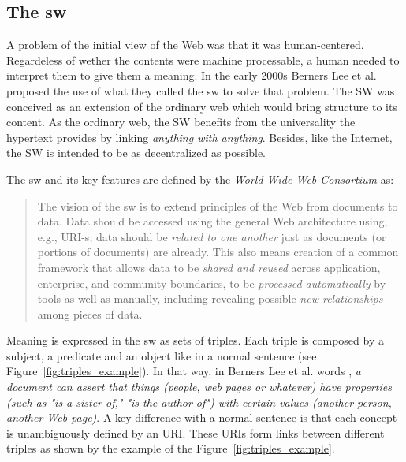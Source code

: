 \subsection{The \acl{sw}}

A problem of the initial view of the Web was that it was human-centered.
Regardeless of wether the contents were machine processable, a human needed to interpret them to give them a meaning.
In the early 2000s Berners Lee et al. \cite{berners-lee_semantic_2001} proposed the use of what they called the \acf{sw} to solve that problem.
The SW was conceived as an extension of the ordinary web which would bring structure to its content.
As the ordinary web, the SW benefits from the universality the hypertext provides by linking \emph{anything with anything}.
Besides, like the Internet, the SW is intended to be as decentralized as possible.

The \acl{sw} and its key features are defined by the \emph{World Wide Web Consortium} \cite{semanticWeb-FAQ} as:
\begin{quote}
The vision of the \acl{sw} is to extend principles of the Web from documents to data.
Data should be accessed using the general Web architecture using, e.g., URI-s;
data should be \emph{related to one another} just as documents (or portions of documents) are already.
This also means creation of a common framework that allows data to be \emph{shared and reused} across application, enterprise, and community boundaries,
to be \emph{processed automatically} by tools as well as manually, including revealing possible \emph{new relationships} among pieces of data.
\end{quote}

Meaning is expressed in the \acl{sw} as sets of triples.
Each triple is composed by a subject, a predicate and an object like in a normal sentence (see Figure~\ref{fig:triples_example}).
In that way, in Berners Lee et al. words \cite{berners-lee_semantic_2001}, \emph{a document can assert that things (people, web pages or whatever) have properties (such as "is a sister of," "is the author of") with certain values (another person, another Web page)}.
A key difference with a normal sentence is that each concept is unambiguously defined by an URI.
These URIs form links between different triples as shown by the example of the Figure~\ref{fig:triples_example}.


